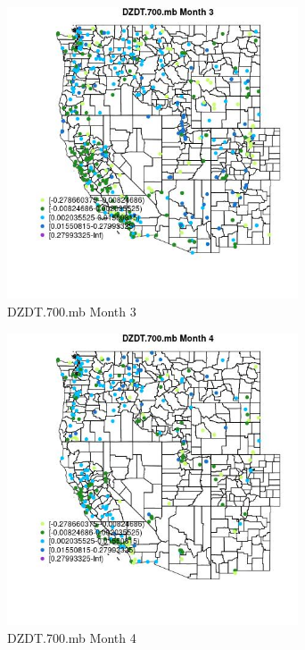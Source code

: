 \begin{figure} 
\centering  
\includegraphics[width=0.77\textwidth]{Code_Outputs/Report_ML_input_PM25_Step4_part_e_de_duplicated_aveswNAs_MapObsMo3DZDT700mb.jpg} 
\caption{\label{fig:Report_ML_input_PM25_Step4_part_e_de_duplicated_aveswNAsMapObsMo3DZDT700mb}DZDT.700.mb Month 3} 
\end{figure} 
 

\begin{figure} 
\centering  
\includegraphics[width=0.77\textwidth]{Code_Outputs/Report_ML_input_PM25_Step4_part_e_de_duplicated_aveswNAs_MapObsMo4DZDT700mb.jpg} 
\caption{\label{fig:Report_ML_input_PM25_Step4_part_e_de_duplicated_aveswNAsMapObsMo4DZDT700mb}DZDT.700.mb Month 4} 
\end{figure} 
 
